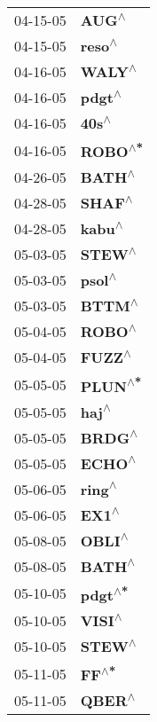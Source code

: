 \begin{supertabular}{p{0.08\textwidth}p{0.2\textwidth}}
 04-15-05 &     \textbf{AUG\textsuperscript{$\wedge$}} \\
 04-15-05 &    \textbf{reso\textsuperscript{$\wedge$}} \\
 04-16-05 &    \textbf{WALY\textsuperscript{$\wedge$}} \\
 04-16-05 &    \textbf{pdgt\textsuperscript{$\wedge$}} \\
 04-16-05 &     \textbf{40s\textsuperscript{$\wedge$}} \\
 04-16-05 &   \textbf{ROBO\textsuperscript{$\wedge$*}} \\
 04-26-05 &    \textbf{BATH\textsuperscript{$\wedge$}} \\
 04-28-05 &    \textbf{SHAF\textsuperscript{$\wedge$}} \\
 04-28-05 &    \textbf{kabu\textsuperscript{$\wedge$}} \\
 05-03-05 &    \textbf{STEW\textsuperscript{$\wedge$}} \\
 05-03-05 &    \textbf{psol\textsuperscript{$\wedge$}} \\
 05-03-05 &    \textbf{BTTM\textsuperscript{$\wedge$}} \\
 05-04-05 &    \textbf{ROBO\textsuperscript{$\wedge$}} \\
 05-04-05 &    \textbf{FUZZ\textsuperscript{$\wedge$}} \\
 05-05-05 &   \textbf{PLUN\textsuperscript{$\wedge$*}} \\
 05-05-05 &     \textbf{haj\textsuperscript{$\wedge$}} \\
 05-05-05 &    \textbf{BRDG\textsuperscript{$\wedge$}} \\
 05-05-05 &    \textbf{ECHO\textsuperscript{$\wedge$}} \\
 05-06-05 &    \textbf{ring\textsuperscript{$\wedge$}} \\
 05-06-05 &     \textbf{EX1\textsuperscript{$\wedge$}} \\
 05-08-05 &    \textbf{OBLI\textsuperscript{$\wedge$}} \\
 05-08-05 &    \textbf{BATH\textsuperscript{$\wedge$}} \\
 05-10-05 &   \textbf{pdgt\textsuperscript{$\wedge$*}} \\
 05-10-05 &    \textbf{VISI\textsuperscript{$\wedge$}} \\
 05-10-05 &    \textbf{STEW\textsuperscript{$\wedge$}} \\
 05-11-05 &     \textbf{FF\textsuperscript{$\wedge$*}} \\
 05-11-05 &    \textbf{QBER\textsuperscript{$\wedge$}} \\

\end{supertabular}
